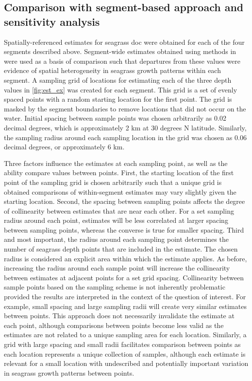 \documentclass[letterpaper,12pt,oneside]{article}\usepackage[]{graphicx}\usepackage[]{color}
\begin{document}
\subsection{Comparison with segment-based approach and sensitivity analysis}

Spatially-referenced estimates for seagrass \ac{doc} were obtained for each of the four segments described above.  Segment-wide estimates obtained using methods in  were used as a basis of comparison such that departures from these values were evidence of spatial heterogeneity in seagrass growth patterns within each segment.  A sampling grid of locations for estimating each of the three depth values in \cref{fig:est_ex} was created for each segment.  This grid is a set of evenly spaced points with a random starting location for the first point.  The grid is masked by the segment boundaries to remove locations that did not occur on the water.  Initial spacing between sample points was chosen arbitrarily as 0.02 decimal degrees, which is approximately 2 km at 30 degrees N latitude.  Similarly, the sampling radius around each sampling location in the grid was chosen as 0.06 decimal degrees, or approximately 6 km.  

Three factors influence the estimates at each sampling point, as well as the ability compare values between points.  First, the starting location of the first point of the sampling grid is chosen arbitrarily such that a unique grid is obtained comparisons of within-segment estimates may vary slightly given the starting location.  Second, the spacing between sampling points affects the degree of collinearity between estimates that are near each other.  For a set sampling radius around each point, estimates will be less correlated at larger spacing between sampling points, whereas the converse is true for smaller spacing.  Third and most important, the radius around each sampling point determines the number of seagrass depth points that are included in the estimate.  The chosen radius is considered an explicit area within which the estimate applies.  As before, increasing the radius around each sample point will increase the collinearity between estimates at adjacent points for a set grid spacing.  Collinearity between sample points based on the sampling scheme is not inherently problematic provided the results are interpreted in the context of the question of interest.  For example, small spacing and large sampling radii will create very similar estimates between points.  This approach does not necessarily invalidate the estimate at each point, although comparisons between points become less valid as the estimates are not related to a unique sampling area for each location.  Similarly, a grid with large spacing and small radii facilitates comparison between points as each location represents a unique collection of samples, although each estimate is relevant for a small location with undescribed and potentially important variation in seagrass growth patterns between points.  
\end{document}
